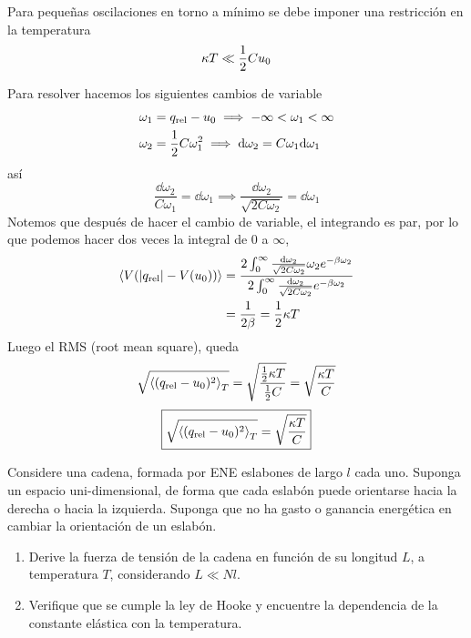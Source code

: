 Para pequeñas oscilaciones en torno a mínimo se debe imponer una restricción en la temperatura
\begin{equation}
  \kappa T\ll \frac{1}{2}Cu_0
\end{equation}

Para resolver hacemos los siguientes cambios de variable
\begin{align}
  \omega_1&= q_{\rm rel}-u_0\implies -\infty<\omega_1<\infty\\
  \omega_2&=\frac{1}{2}C\omega_1^2\implies \dd\omega_2=C\omega_1\dd\omega_1
\end{align}
así
\begin{equation}
  \frac{\dd \omega_2}{C\omega_1}=\dd \omega_1\implies \frac{\dd\omega_2}{\sqrt{2C\omega_2}}=\dd\omega_1
\end{equation}
Notemos que después de hacer el cambio de variable, el integrando es par, por lo que podemos hacer dos veces la integral de $0$ a $\infty$,
\begin{align}
  \ev{V(|q_{\rm rel}|-V(u_0))}&=\frac{2\int_0^\infty \frac{\dd\omega_2}{\sqrt{2C\omega_2}}\omega_2e^{-\b \omega_2}}{2\int_0^\infty \frac{\dd \omega_2}{\sqrt{2C\omega_2}}e^{-\b\omega_2}}\\
  &=\frac{1}{2\b }=\frac{1}{2}\k T
\end{align}
Luego el RMS (root mean square), queda
\begin{align}
  \sqrt{\ev{(q_{\rm rel}-u_0)^2}_T}=\sqrt{\frac{\frac{1}{2}\k T}{\frac{1}{2}C}}=\sqrt{\frac{\k T}{C}}
\end{align}
\begin{equation}
 \boxed{ \sqrt{\ev{(q_{\rm rel}-u_0)^2}_T}=\sqrt{\frac{\k T}{C}}}
\end{equation}

\begin{ej}
	Considere una cadena, formada por ENE eslabones de largo $l$ cada uno. Suponga un espacio uni-dimensional, de forma que cada eslabón puede orientarse hacia la derecha o hacia la izquierda. Suponga que no ha gasto o ganancia energética en cambiar la orientación de un eslabón.
	\begin{enumerate}
		\item Derive la fuerza de tensión de la cadena en función de su longitud $L$, a temperatura $T$, considerando $L\ll Nl$.
		\item Verifique que se cumple la ley de Hooke y encuentre la dependencia de la constante elástica con la temperatura.
	\end{enumerate}
\end{ej}

